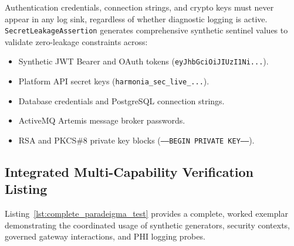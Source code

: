 Authentication credentials, connection strings, and crypto keys must never appear in any log sink, regardless of whether diagnostic logging is active. \texttt{SecretLeakageAssertion} generates comprehensive synthetic sentinel values to validate zero-leakage constraints across:
\begin{itemize}
    \item Synthetic JWT Bearer and OAuth tokens (\texttt{eyJhbGciOiJIUzI1Ni...}).
    \item Platform API secret keys (\texttt{harmonia\_sec\_live\_...}).
    \item Database credentials and PostgreSQL connection strings.
    \item ActiveMQ Artemis message broker passwords.
    \item RSA and PKCS\#8 private key blocks (\texttt{-----BEGIN PRIVATE KEY-----}).
\end{itemize}

\subsection{Integrated Multi-Capability Verification Listing}

Listing~\ref{lst:complete_paradeigma_test} provides a complete, worked exemplar demonstrating the coordinated usage of synthetic generators, security contexts, governed gateway interactions, and PHI logging probes.

